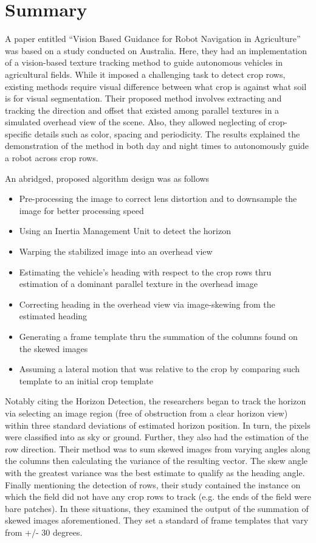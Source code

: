 \section{Summary}

A paper entitled “Vision Based Guidance for Robot Navigation in Agriculture” was based on a study conducted on Australia. Here, they had an implementation of a vision-based texture tracking method to guide autonomous vehicles in agricultural fields. While it imposed a challenging task to detect crop rows, existing methods require visual difference between what crop is against what soil is for visual segmentation. Their proposed method involves extracting and tracking the direction and offset that existed among parallel textures in a simulated overhead view of the scene. Also, they allowed neglecting of crop-specific details such as color, spacing and periodicity. The results explained the demonstration of the method in both day and night times to autonomously guide a robot across crop rows.
 
    An abridged, proposed algorithm design was as follows
\begin{itemize}
\item Pre-processing the image to correct lens distortion and to downsample the image for better processing speed\item Using an Inertia Management Unit to detect the horizon
\item Warping the stabilized image into an overhead view
\item Estimating the vehicle’s heading with respect to the crop rows thru estimation of a dominant parallel texture in the overhead image
\item Correcting heading in the overhead view via image-skewing from the estimated heading
\item Generating a frame template thru the summation of the columns found on the skewed images
\item Assuming a lateral motion that was relative to the crop by comparing such template to an initial crop template
\end{itemize}
\tab Notably citing the Horizon Detection, the researchers began to track the horizon via selecting an image region (free of obstruction from a clear horizon view) within three standard deviations of estimated horizon position. In turn, the pixels were classified into as sky or ground. Further, they also had the estimation of the row direction. Their method was to sum skewed images from varying angles along the columns then calculating the variance of the resulting vector. The skew angle with the greatest variance was the best estimate to qualify as the heading angle. Finally mentioning the detection of rows, their study contained the instance on which the field did not have any crop rows to track (e.g. the ends of the field were bare patches). In these situations, they examined the output of the summation of skewed images aforementioned. They set a standard of frame templates that vary from +/- 30 degrees.
 
